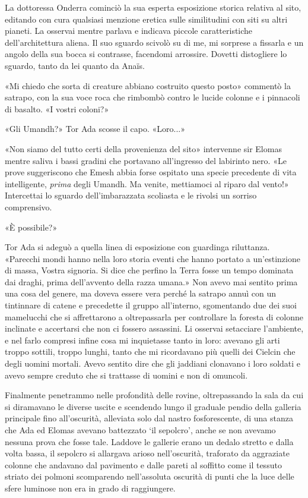 La dottoressa Onderra cominciò la sua esperta esposizione storica
relativa al sito, editando con cura qualsiasi menzione eretica sulle
similitudini con siti su altri pianeti. La osservai mentre parlava e
indicava piccole caratteristiche dell'architettura aliena. Il suo
sguardo scivolò su di me, mi sorprese a fissarla e un angolo della sua
bocca si contrasse, facendomi arrossire. Dovetti distogliere lo sguardo,
tanto da lei quanto da Anaïs.

«Mi chiedo che sorta di creature abbiano costruito questo posto»
commentò la satrapo, con la sua voce roca che rimbombò contro le lucide
colonne e i pinnacoli di basalto. «I vostri coloni?»

«Gli Umandh?» Tor Ada scosse il capo. «Loro...»

«Non siamo del tutto certi della provenienza del sito» intervenne sir
Elomas mentre saliva i bassi gradini che portavano all'ingresso del
labirinto nero. «Le prove suggeriscono che Emesh abbia forse ospitato
una specie precedente di vita intelligente, \emph{prima} degli Umandh.
Ma venite, mettiamoci al riparo dal vento!» Intercettai lo sguardo
dell'imbarazzata scoliasta e le rivolsi un sorriso comprensivo.

«È possibile?»

Tor Ada si adeguò a quella linea di esposizione con guardinga
riluttanza. «Parecchi mondi hanno nella loro storia eventi che hanno
portato a un'estinzione di massa, Vostra signoria. Si dice che perfino
la Terra fosse un tempo dominata dai draghi, prima dell'avvento della
razza umana.» Non avevo mai sentito prima una cosa del genere, ma doveva
essere vera perché la satrapo annuì con un tintinnare di catene e
precedette il gruppo all'interno, sgomentando due dei suoi mamelucchi
che si affrettarono a oltrepassarla per controllare la foresta di
colonne inclinate e accertarsi che non ci fossero assassini. Li osservai
setacciare l'ambiente, e nel farlo compresi infine cosa mi inquietasse
tanto in loro: avevano gli arti troppo sottili, troppo lunghi, tanto che
mi ricordavano più quelli dei Cielcin che degli uomini mortali. Avevo
sentito dire che gli jaddiani clonavano i loro soldati e avevo sempre
creduto che si trattasse di uomini e non di omuncoli.

Finalmente penetrammo nelle profondità delle rovine, oltrepassando la
sala da cui si diramavano le diverse uscite e scendendo lungo il
graduale pendio della galleria principale fino all'oscurità, alleviata
solo dal nastro fosforescente, di una stanza che Ada ed Elomas avevano
battezzato `il sepolcro', anche se non avevamo nessuna prova che fosse
tale. Laddove le gallerie erano un dedalo stretto e dalla volta bassa,
il sepolcro si allargava arioso nell'oscurità, traforato da aggraziate
colonne che andavano dal pavimento e dalle pareti al soffitto come il
tessuto striato dei polmoni scomparendo nell'assoluta oscurità di punti
che la luce delle sfere luminose non era in grado di raggiungere.

